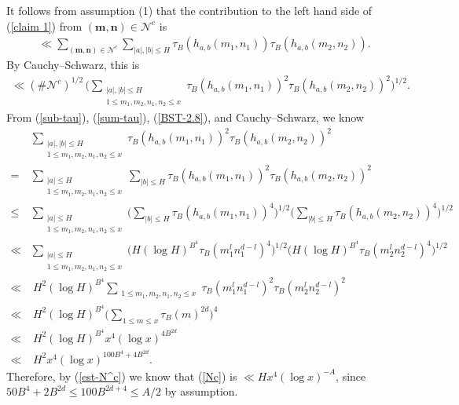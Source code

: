 \documentclass[reqno, 11pt]{amsart}
\renewcommand{\leq}{\leqslant}
\theoremstyle{definition}
\theoremstyle{definition}
\renewcommand{\leq}{\leqslant}
\newcommand{\mm}{\mathbf{m}}
\newcommand{\nn}{\mathbf{n}}
\numberwithin{equation}{section}
\begin{document}
It follows from assumption (1) that the contribution to the left hand side of (\ref{claim 1}) from $(\mm,\nn)\in\mathcal{N}^c$ is
\begin{align*}
	\ll \sum_{(\mm, \nn) \in \mathcal{N}^c} \sum_{|a|, |b| \leq H} \tau_B(h_{a, b}(m_1, n_1)) \tau_B(h_{a, b}(m_2, n_2)).
\end{align*}
By Cauchy--Schwarz, this is 
\begin{align}\label{Nc}
	\ll (\# \mathcal{N}^c)^{1/2} \, \Big( \sum_{\substack{ |a|, |b| \leq H \\ 1 \leq m_1, m_2, n_1, n_2 \leq x}} \tau_B(h_{a, b}(m_1, n_1))^2 \tau_B(h_{a, b}(m_2, n_2))^2 \Big)^{1/2}.
\end{align}
From (\ref{sub-tau}), (\ref{sum-tau}), (\ref{BST-2.8}), and Cauchy--Schwarz, we know
\begin{align*}
	& \sum_{\substack{ |a|, |b| \leq H \\ 1 \leq m_1, m_2, n_1, n_2 \leq x}} \tau_B(h_{a, b}(m_1, n_1))^2 \tau_B(h_{a, b}(m_2, n_2))^2 \\
	= &  
 \sum_{\substack{ |a| \leq H \\ 1 \leq m_1, m_2, n_1, n_2 \leq x}} \sum_{|b| \leq H} \tau_B(h_{a, b}(m_1, n_1))^2 \tau_B(h_{a, b}(m_2, n_2))^2 \\
	\leq & \sum_{\substack{ |a| \leq H \\ 1 \leq m_1, m_2, n_1, n_2 \leq x}} \Big( \sum_{|b| \leq H} \tau_B(h_{a, b}(m_1, n_1))^4 \Big)^{1/2} \Big( \sum_{|b| \leq H} \tau_B(h_{a, b}(m_2, n_2))^4 \Big)^{1/2} \\
	\ll & \sum_{\substack{ |a| \leq H \\ 1 \leq m_1, m_2, n_1, n_2 \leq x}} \Big( H (\log H)^{B^4} \tau_B(m_1^l n_1^{d-l})^4  \Big)^{1/2} \Big( H (\log H)^{B^4} \tau_B(m_2^l n_2^{d-l})^4 \Big)^{1/2} \\
	\ll & \  H^2 (\log H)^{B^4} \sum_{\substack{ 1 \leq m_1, m_2, n_1, n_2 \leq x}} \tau_B(m_1^l n_1^{d-l})^2 \tau_B(m_2^l n_2^{d-l})^2 \\
	\ll & \ H^2 (\log H)^{B^4} \Big(\sum_{1 \leq m \leq x} \tau_B(m)^{2d} \Big)^4  \\
	\ll & \ H^2 (\log H)^{B^4} x^4 (\log x)^{4 B^{2d}} \\
	\ll & \ H^2 x^4 (\log x)^{100B^4 + 4B^{2d}}.
\end{align*}
Therefore, by (\ref{est-N^c}) we know that  (\ref{Nc}) is $\ll H x^4 (\log x)^{-A}$, since $50 B^4 + 2B^{2d} \leq 100B^{2d+4} \leq A/2$ by assumption.
\end{document}
